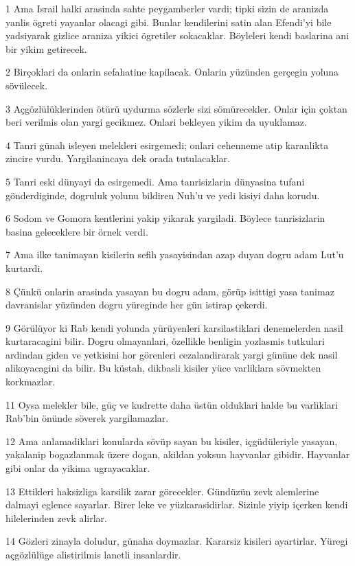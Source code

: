 \par 1 Ama Israil halki arasinda sahte peygamberler vardi; tipki sizin de aranizda yanlis ögreti yayanlar olacagi gibi. Bunlar kendilerini satin alan Efendi'yi bile yadsiyarak gizlice araniza yikici ögretiler sokacaklar. Böyleleri kendi baslarina ani bir yikim getirecek.
\par 2 Birçoklari da onlarin sefahatine kapilacak. Onlarin yüzünden gerçegin yoluna sövülecek.
\par 3 Açgözlülüklerinden ötürü uydurma sözlerle sizi sömürecekler. Onlar için çoktan beri verilmis olan yargi gecikmez. Onlari bekleyen yikim da uyuklamaz.
\par 4 Tanri günah isleyen melekleri esirgemedi; onlari cehenneme atip karanlikta zincire vurdu. Yargilanincaya dek orada tutulacaklar.
\par 5 Tanri eski dünyayi da esirgemedi. Ama tanrisizlarin dünyasina tufani gönderdiginde, dogruluk yolunu bildiren Nuh'u ve yedi kisiyi daha korudu.
\par 6 Sodom ve Gomora kentlerini yakip yikarak yargiladi. Böylece tanrisizlarin basina geleceklere bir örnek verdi.
\par 7 Ama ilke tanimayan kisilerin sefih yasayisindan azap duyan dogru adam Lut'u kurtardi.
\par 8 Çünkü onlarin arasinda yasayan bu dogru adam, görüp isittigi yasa tanimaz davranislar yüzünden dogru yüreginde her gün istirap çekerdi.
\par 9 Görülüyor ki Rab kendi yolunda yürüyenleri karsilastiklari denemelerden nasil kurtaracagini bilir. Dogru olmayanlari, özellikle benligin yozlasmis tutkulari ardindan giden ve yetkisini hor görenleri cezalandirarak yargi gününe dek nasil alikoyacagini da bilir. Bu küstah, dikbasli kisiler yüce varliklara sövmekten korkmazlar.
\par 11 Oysa melekler bile, güç ve kudrette daha üstün olduklari halde bu varliklari Rab'bin önünde söverek yargilamazlar.
\par 12 Ama anlamadiklari konularda sövüp sayan bu kisiler, içgüdüleriyle yasayan, yakalanip bogazlanmak üzere dogan, akildan yoksun hayvanlar gibidir. Hayvanlar gibi onlar da yikima ugrayacaklar.
\par 13 Ettikleri haksizliga karsilik zarar görecekler. Gündüzün zevk alemlerine dalmayi eglence sayarlar. Birer leke ve yüzkarasidirlar. Sizinle yiyip içerken kendi hilelerinden zevk alirlar.
\par 14 Gözleri zinayla doludur, günaha doymazlar. Kararsiz kisileri ayartirlar. Yüregi açgözlülüge alistirilmis lanetli insanlardir.
